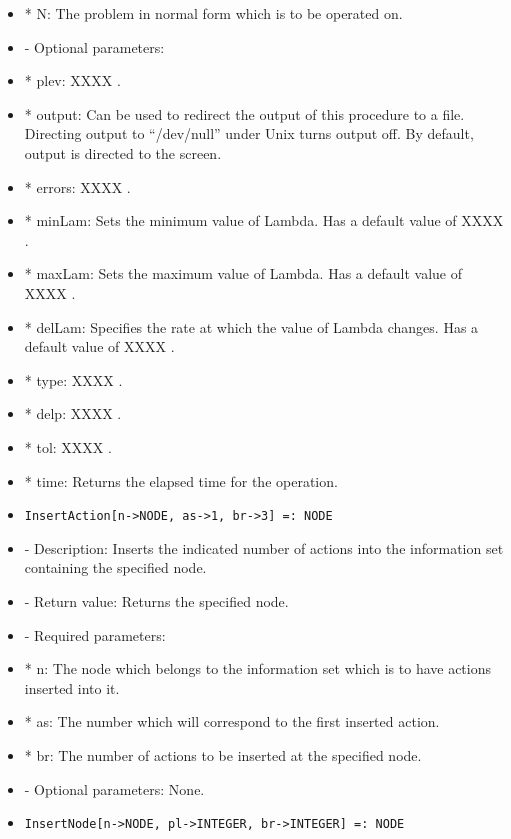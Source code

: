\begin{itemize}
\bd
\item  
*  N:  The problem in normal form which is to be operated on.
\ed

\item
- Optional parameters:

\bd
\item	
 *  plev:  XXXX .
\item
*  output:  Can be used to redirect the output of this procedure to a
file.  Directing output to ``/dev/null'' under Unix turns output off.
By default, output is directed to the screen.
\item
*  errors:  XXXX .
\item
*  minLam:  Sets the minimum value of Lambda.  Has a default value of
XXXX .
\item
*  maxLam:  Sets the maximum value of Lambda.  Has a default value of XXXX .
\item
*  delLam:  Specifies the rate at which the value of Lambda changes.
Has a default value of XXXX .
\item
*  type:  XXXX .
\item
*  delp:  XXXX .
\item
*  tol:  XXXX .
\item
*  time:  Returns the elapsed time for the operation.
\ed
\ed

\item
\begin{verbatim}
InsertAction[n->NODE, as->1, br->3] =: NODE
\end{verbatim}

\bd
\item
- Description:  Inserts the indicated number of actions into the 
information set containing the specified node.
\item
- Return value:  Returns the specified node.
\item
- Required parameters:

\bd
\item
*  n:  The node which belongs to the information set which is to have
actions inserted into it.
\item
*  as:  The number which will correspond to the first inserted action.
\item
*  br:  The number of actions to be inserted at the specified node.
\ed

\item
- Optional parameters:  None.
\ed

\item
\begin{verbatim}
InsertNode[n->NODE, pl->INTEGER, br->INTEGER] =: NODE
\end{verbatim}


\end{itemize}
